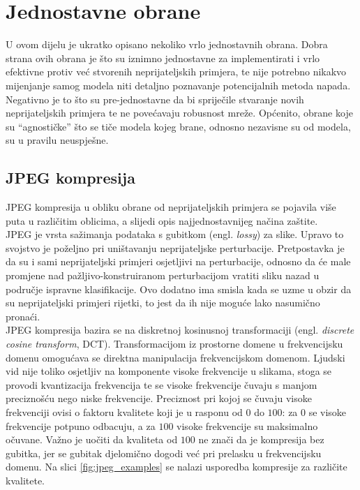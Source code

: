 \documentclass[utf8, diplomski]{fer}
\begin{document}
\section{Jednostavne obrane}
U ovom dijelu je ukratko opisano nekoliko vrlo jednostavnih obrana. Dobra strana ovih obrana je što su iznimno jednostavne za implementirati i vrlo efektivne protiv već stvorenih neprijateljskih primjera, te nije potrebno nikakvo mijenjanje samog modela niti detaljno poznavanje potencijalnih metoda napada. Negativno je to što su pre-jednostavne da bi spriječile stvaranje novih neprijateljskih primjera te ne povećavaju robusnost mreže. Općenito, obrane koje su ``agnostičke'' što se tiče modela kojeg brane, odnosno nezavisne su od modela, su u pravilu neuspješne.
\subsection{JPEG kompresija}\label{jpeg_comp}
JPEG kompresija u obliku obrane od neprijateljskih primjera se pojavila više puta u različitim oblicima\citep{jpeg1}\citep{jpeg2}\citep{jpeg3}, a slijedi opis najjednostavnijeg načina zaštite. \\
JPEG je vrsta sažimanja podataka s gubitkom (engl. \textit{lossy}) za slike. Upravo to svojstvo je poželjno pri uništavanju neprijateljske perturbacije. Pretpostavka je da su i sami neprijateljski primjeri osjetljivi na perturbacije, odnosno da će male promjene nad pažljivo-konstruiranom perturbacijom vratiti sliku nazad u područje ispravne klasifikacije. Ovo dodatno ima smisla kada se uzme u obzir da su neprijateljski primjeri rijetki, to jest da ih nije moguće lako nasumično pronaći. \\
JPEG kompresija bazira se na diskretnoj kosinusnoj transformaciji (engl. \textit{discrete cosine transform}, DCT). Transformacijom iz prostorne domene u frekvencijsku domenu omogućava se direktna manipulacija frekvencijskom domenom. Ljudski vid nije toliko osjetljiv na komponente visoke frekvencije u slikama, stoga se provodi kvantizacija frekvencija te se visoke frekvencije čuvaju s manjom preciznošću nego niske frekvencije. Preciznost pri kojoj se čuvaju visoke frekvenciji ovisi o faktoru kvalitete koji je u rasponu od $0$ do $100$: za $0$ se visoke frekvencije potpuno odbacuju, a za $100$ visoke frekvencije su maksimalno očuvane. Važno je uočiti da kvaliteta od $100$ ne znači da je kompresija bez gubitka, jer se gubitak djelomično dogodi već pri prelasku u frekvencijsku domenu. Na slici \ref{fig:jpeg_examples} se nalazi usporedba kompresije za različite kvalitete.
\end{document}

